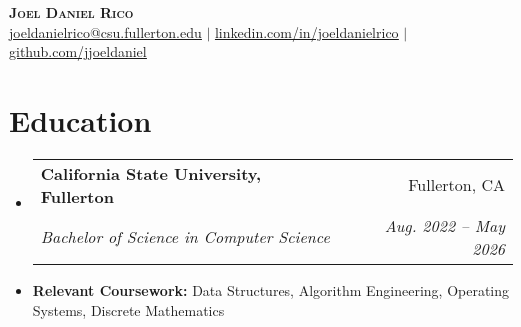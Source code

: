\documentclass[letterpaper,11pt]{article}
\makeatletter
\newcommand{\resumeItem}[1]{
  \item\small{
    {#1 \vspace{-2pt}}
  }
}
\newcommand{\resumeSubheading}[4]{
  \vspace{-2pt}\item
    \begin{tabular*}{0.97\textwidth}[t]{l@{\extracolsep{\fill}}r}
      \textbf{#1} & #2 \\
      \textit{\small#3} & \textit{\small #4} \\
    \end{tabular*}\vspace{-7pt}
}
\newcommand{\resumeSubHeadingListStart}{\begin{itemize}[leftmargin=0.15in, label={}]}
\newcommand{\resumeSubHeadingListEnd}{\end{itemize}}
\makeatother
\begin{document}
\begin{center}
    \textbf{\Huge \scshape Joel Daniel Rico} \\ \vspace{1pt}
    \small \href{mailto:joeldanielrico@csu.fullerton.edu.com}{\underline{joeldanielrico@csu.fullerton.edu}} $|$ 
    \href{https://linkedin.com/in/joeldanielrico}{\underline{linkedin.com/in/joeldanielrico}} $|$
    \href{https://github.com/jjoeldaniel}{\underline{github.com/jjoeldaniel }}
\end{center}

\section{Education}
  \resumeSubHeadingListStart
    \resumeSubheading
      {California State University, Fullerton}{Fullerton, CA}
      {Bachelor of Science in Computer Science}{Aug. 2022 -- May 2026}
    \resumeItem{\textbf{Relevant Coursework: }Data Structures, Algorithm Engineering, Operating Systems, Discrete Mathematics}
  \resumeSubHeadingListEnd

\end{document}
